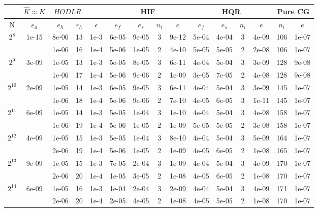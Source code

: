 \documentclass[11pt]{article}
\begin{document}
\begin{table}[!htbp]
\centering
\begin{tabular}{|c|c|c|c|c|c|c|c|c|c|c|c|c|c|c|}
\hline
\multicolumn{1}{c|}{} & \multicolumn{1}{c|}{$\hat{K} \approx K$} & \multicolumn{2}{c|}{$HODLR$} & \multicolumn{1}{c|}{} &\multicolumn{4}{c|}{HIF} & \multicolumn{4}{c|}{HQR} & \multicolumn{2}{c|}{Pure CG} \\
\hline
N & $e_{a}$ & $e_{h}$ & $r_{h}$ & $\epsilon$ & $e_{f}$ & $e_{s}$ & $n_{i}$ & $e$ & $e_{f}$  & $e_{s}$ & $n_{i}$ & $e$ &  $n_{i}$ & $e$ \\ 
\hline
$2^{8}$ & 1e-15 & 8e-06 & 13 & 1e-3 & 6e-05 & 9e-05 & 3 & 9e-12 & 5e-04 & 4e-04 & 3 & 4e-09 & 106 & 1e-07\\
~ & ~ & 1e-06 & 16 & 1e-4 & 5e-06 & 1e-05 & 2 & 4e-10 & 5e-05 & 5e-05 & 2 & 2e-08 & 106 & 1e-07\\
\hline
$2^{9}$ & 3e-09 & 1e-05 & 13 & 1e-3 & 5e-05 & 8e-05 & 3 & 6e-11 & 4e-04 & 5e-04 & 3 & 3e-09 & 128 & 9e-08\\
~ & ~ & 1e-06 & 17 & 1e-4 & 5e-06 & 9e-06 & 2 & 1e-09 & 3e-05 & 7e-05 & 2 & 4e-08 & 128 & 9e-08\\
\hline
$2^{10}$ & 2e-09 & 1e-05 & 14 & 1e-3 & 6e-05 & 9e-05 & 3 & 6e-11 & 4e-04 & 5e-04 & 3 & 3e-09 & 145 & 1e-07\\
~ & ~ & 1e-06 & 18 & 1e-4 & 5e-06 & 9e-06 & 2 & 7e-10 & 4e-05 & 6e-05 & 3 & 1e-11 & 145 & 1e-07\\
\hline
$2^{11}$ & 6e-09 & 1e-05 & 14 & 1e-3 & 5e-05 & 1e-04 & 3 & 1e-10 & 4e-04 & 5e-04 & 3 & 4e-08 & 158 & 1e-07\\
~ & ~ & 1e-06 & 19 & 1e-4 & 5e-06 & 1e-05 & 2 & 1e-09 & 5e-05 & 5e-05 & 2 & 3e-08 & 158 & 1e-07\\
\hline
$2^{12}$ & 4e-09 & 1e-05 & 15 & 1e-3 & 5e-05 & 1e-04 & 3 & 8e-10 & 4e-04 & 5e-04 & 3 & 5e-09 & 164 & 1e-07\\
~ & ~ & 2e-06 & 19 & 1e-4 & 5e-06 & 1e-05 & 2 & 1e-09 & 4e-05 & 6e-05 & 2 & 1e-08 & 165 & 1e-07\\
\hline
$2^{13}$ & 9e-09 & 1e-05 & 15 & 1e-3 & 7e-05 & 2e-04 & 3 & 1e-09 & 4e-04 & 5e-04 & 3 & 4e-09 & 170 & 1e-07\\
~ & ~ & 2e-06 & 20 & 1e-4 & 1e-05 & 3e-05 & 2 & 1e-08 & 4e-05 & 6e-05 & 2 & 1e-08 & 170 & 1e-07\\
\hline
$2^{14}$ & 6e-09 & 1e-05 & 16 & 1e-3 & 1e-04 & 2e-04 & 3 & 2e-09 & 4e-04 & 5e-04 & 3 & 4e-09 & 171 & 1e-07\\
~ & ~ & 2e-06 & 20 & 1e-4 & 2e-05 & 4e-05 & 2 & 1e-08 & 4e-05 & 5e-05 & 2 & 1e-08 & 170 & 1e-07\\

\end{tabular}
\end{table}
\end{document}
